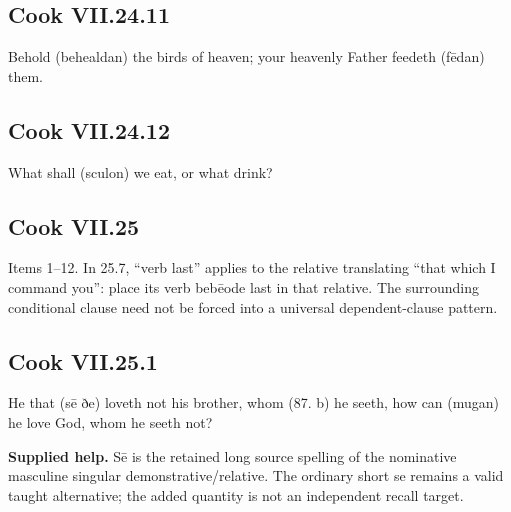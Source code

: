 \par\begin{minipage}{\linewidth}\raggedright
\subsection*{Cook VII.24.11}

Behold (behealdan) the birds of heaven; your heavenly Father feedeth (fēdan) them.

\end{minipage}\par\addvspace{4pt}

\par\begin{minipage}{\linewidth}\raggedright
\subsection*{Cook VII.24.12}

What shall (sculon) we eat, or what drink?

\end{minipage}\par\addvspace{4pt}

\subsection*{Cook VII.25}

Items 1–12. In 25.7, “verb last” applies to the relative translating “that which I command you”: place its verb bebēode last in that relative. The surrounding conditional clause need not be forced into a universal dependent-clause pattern.

\par\begin{minipage}{\linewidth}\raggedright
\subsection*{Cook VII.25.1}

He that (sē ðe) loveth not his brother, whom (87. b) he seeth, how can (mugan) he love God, whom he seeth not?

\textbf{Supplied help.} Sē is the retained long source spelling of the nominative masculine singular demonstrative/\allowbreak{}relative. The ordinary short se remains a valid taught alternative; the added quantity is not an independent recall target.

\end{minipage}\par\addvspace{4pt}

